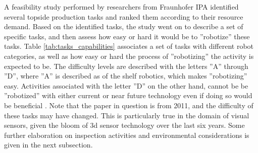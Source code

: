 A feasibility study performed by researchers from \ac{Fraunhofer IPA} identified several topside production tasks and ranked them according to their resource demand. 
Based on the identified tasks, the study went on to describe a set of specific tasks, and then assess how easy or hard it would be to ''robotize'' these tasks. Table \ref{tab:tasks_capabilities} associates a set of tasks with different robot categories, as well as how easy or hard the process of ''robotizing'' the activity is expected to be. The difficulty levels are described with the letters ''A'' through ''D'', where  ''A'' is described as of the shelf robotics, which makes ''robotizing'' easy. Activities associated with the letter ''D'' on the other hand, cannot be be ''robotized'' with either current or near future technology even if doing so would be beneficial \cite{6094661}. Note that the paper in question is from 2011, and the difficulty of these tasks may have changed. This is particularly true in the domain of visual sensors, given the bloom of 3d sensor technology over the last six years. Some further elaboration on inspection activities and environmental considerations is given in the next subsection. 


